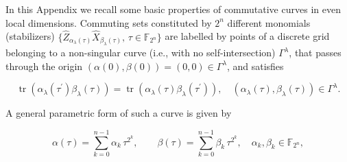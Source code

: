 \documentclass[quantumrep,article,submit,pdftex,moreauthors]{Definitions/mdpi}
\DeclareMathOperator{\tr}{tr}
\begin{document}
\vspace{6pt} 


\authorcontributions{}




\appendixstart
\appendix
\section[\appendixname~\thesection]{}\label{appA}

In this Appendix we recall some basic properties of commutative curves in
even local dimensions. Commuting sets constituted by $2^{n}$ different monomials
(stabilizers) $\{ \hat{Z}_{\alpha _{\lambda }(\tau )}\hat{X}_{\beta _{\lambda
}(\tau )}, \, \tau \in \mathbb{F}_{2^{n}}\}$ are labelled by points of a
discrete grid belonging to a non-singular curve (i.e., with no
self-intersection) $\Gamma^{\lambda}$, that passes through the origin $(\alpha
(0),\beta (0))=(0,0)\in \Gamma^{\lambda }$, and satisfies

\begin{equation*}
  \tr\left(
    \alpha_{\lambda}(\tau^{\prime})\beta_{\lambda}(\tau)
  \right)
  = \tr\left(
    \alpha_{\lambda}(\tau)\beta_{\lambda}(\tau^{\prime })
  \right),
  \quad \left(
    \alpha_{\lambda }(\tau), \beta_{\lambda}(\tau)
  \right) \in \Gamma^{\lambda}.
\end{equation*}

A general parametric form of such a curve is given by

\begin{equation}
  \alpha (\tau)
  = \sum_{k=0}^{n-1}\alpha_{k}\,\tau^{2^{k}},
  \qquad
  \beta(\tau)
  = \sum_{k=0}^{n-1}\beta_{k} \, \tau^{2^{k}},
  \quad \alpha_{k},\beta_{k}\in \mathbb{F}_{2^{n}},
  \label{curve1a}
\end{equation}
\end{document}
